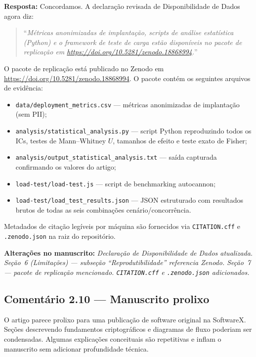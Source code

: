 \documentclass[11pt,a4paper]{article}
\newcommand{\response}[1]{\par\noindent\textcolor{responsecolor}{\textbf{Resposta:}} #1}
\newcommand{\change}[1]{\par\noindent\textcolor{changecolor}{\textbf{Alterações no manuscrito:}} \textit{#1}}
\begin{document}
\response{Concordamos. A declaração revisada de Disponibilidade de Dados agora diz:}

\begin{quote}
``\textit{Métricas anonimizadas de implantação, scripts de análise estatística (Python) e o framework de teste de carga estão disponíveis no pacote de replicação em \url{https://doi.org/10.5281/zenodo.18868994}.}''
\end{quote}

O pacote de replicação está publicado no Zenodo em \url{https://doi.org/10.5281/zenodo.18868994}. O pacote contém os seguintes arquivos de evidência:
\begin{itemize}[nosep]
  \item \texttt{data/deployment\_metrics.csv} --- métricas anonimizadas de implantação (sem PII);
  \item \texttt{analysis/statistical\_analysis.py} --- script Python reproduzindo todos os ICs, testes de Mann--Whitney $U$, tamanhos de efeito e teste exato de Fisher;
  \item \texttt{analysis/output\_statistical\_analysis.txt} --- saída capturada confirmando os valores do artigo;
  \item \texttt{load-test/load-test.js} --- script de benchmarking autocannon;
  \item \texttt{load-test/load\_test\_results.json} --- JSON estruturado com resultados brutos de todas as seis combinações cenário/concorrência.
\end{itemize}

Metadados de citação legíveis por máquina são fornecidos via \texttt{CITATION.cff} e \texttt{.zenodo.json} na raiz do repositório.

\change{Declaração de Disponibilidade de Dados atualizada. Seção~6 (Limitações) --- subseção ``Reprodutibilidade'' referencia Zenodo. Seção~7 --- pacote de replicação mencionado. \texttt{CITATION.cff} e \texttt{.zenodo.json} adicionados.}

\bigskip

\subsection*{Comentário 2.10 --- Manuscrito prolixo}

\begin{reviewerbox}
O artigo parece prolixo para uma publicação de software original na SoftwareX. Seções descrevendo fundamentos criptográficos e diagramas de fluxo poderiam ser condensadas. Algumas explicações conceituais são repetitivas e inflam o manuscrito sem adicionar profundidade técnica.
\end{reviewerbox}
\end{document}
